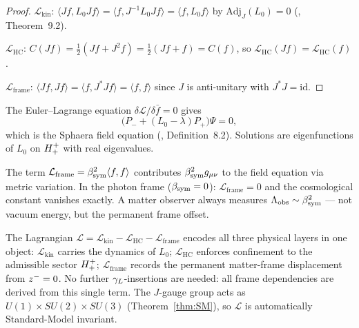 \begin{proof}
$\mathcal{L}_{\mathrm{kin}}$:
$\langle Jf,L_0 Jf\rangle = \langle f,J^{-1}L_0 Jf\rangle
= \langle f,L_0 f\rangle$
by $\mathrm{Adj}_J(L_0)=0$ (\cite{brendecke2026rh}, Theorem~9.2).

$\mathcal{L}_{\mathrm{HC}}$:
$C(Jf)=\tfrac{1}{2}(Jf+J^2 f)=\tfrac{1}{2}(Jf+f)=C(f)$,
so $\mathcal{L}_{\mathrm{HC}}(Jf)=\mathcal{L}_{\mathrm{HC}}(f)$.

$\mathcal{L}_{\mathrm{frame}}$:
$\langle Jf,Jf\rangle=\langle f,J^*Jf\rangle=\langle f,f\rangle$
since $J$ is anti-unitary with $J^*J=\mathrm{id}$.
\end{proof}

\begin{theorem}
\label{thm:eom}
The Euler--Lagrange equation $\delta\mathcal{L}/\delta\bar f=0$ gives
\[
  \bigl(P_-+(L_0-\lambda)P_+\bigr)\Psi=0,
\]
which is the Sphaera field equation (\cite{brendecke2026rh}, Definition~8.2).
Solutions are eigenfunctions of $L_0$ on $H^+_+$ with real
eigenvalues.
\end{theorem}

\begin{proposition}
\label{prop:lambda-from-frame}
The term $\mathcal{L}_{\mathrm{frame}}=\beta_{\mathrm{sym}}^2\langle f,f\rangle$
contributes $\beta_{\mathrm{sym}}^2 g_{\mu\nu}$ to the field equation via metric
variation.
In the photon frame ($\beta_{\mathrm{sym}}=0$): $\mathcal{L}_{\mathrm{frame}}=0$
and the cosmological constant vanishes exactly.
A matter observer always measures $\Lambda_{\mathrm{obs}}\sim\beta_{\mathrm{sym}}^2$
--- not vacuum energy, but the permanent frame offset.
\end{proposition}

\begin{remark}
The Lagrangian $\mathcal{L}=\mathcal{L}_{\mathrm{kin}}
-\mathcal{L}_{\mathrm{HC}}-\mathcal{L}_{\mathrm{frame}}$ encodes all
three physical layers in one object:
$\mathcal{L}_{\mathrm{kin}}$ carries the dynamics of $L_0$;
$\mathcal{L}_{\mathrm{HC}}$ enforces confinement to the admissible
sector $H^+_+$;
$\mathcal{L}_{\mathrm{frame}}$ records the permanent matter-frame
displacement from $z^-=0$.
No further $\gamma_L$-insertions are needed: all frame dependencies are
derived from this single term.
The $J$-gauge group acts as $U(1)\times SU(2)\times SU(3)$
(Theorem~\ref{thm:SM}), so $\mathcal{L}$ is automatically
Standard-Model invariant.
\end{remark}

